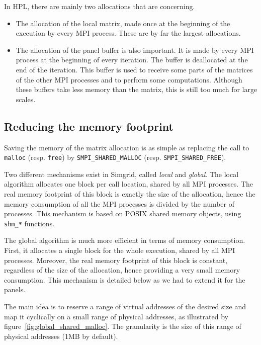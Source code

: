 \documentclass[12pt, a4paper]{memoir}
\begin{document}
In HPL, there are mainly two allocations that are concerning.
\begin{itemize}
\item The allocation of the local matrix, made once at the beginning of the execution by every MPI process. These are by
far the largest allocations.
\item The allocation of the panel buffer is also important. It is made by every MPI process at the beginning of every
iteration. The buffer is deallocated at the end of the iteration. This buffer is used to receive some parts of the
matrices of the other MPI processes and to perform some computations. Although these buffers take less memory than
the matrix, this is still too much for large scales.
\end{itemize}
\subsection{Reducing the memory footprint}
\label{sec:org7de7ffe}
Saving the memory of the matrix allocation is as simple as replacing the call to \texttt{malloc} (resp. \texttt{free}) by
\texttt{SMPI\_SHARED\_MALLOC} (resp. \texttt{SMPI\_SHARED\_FREE}).

Two different mechanisms exist in Simgrid, called \emph{local} and \emph{global}. The local algorithm allocates one block per call
location, shared by all MPI processes. The real memory footprint of this block is exactly the size of the allocation,
hence the memory consumption of all the MPI processes is divided by the number of processes. This mechanism is based
on POSIX shared memory objects, using \texttt{shm\_*} functions.

The global algorithm is much more efficient in terms of memory consumption. First, it allocates a single block for
the whole execution, shared by all MPI processes. Moreover, the real memory footprint of this block is constant,
regardless of the size of the allocation, hence providing a very small memory consumption. This mechanism is
detailed below as we had to extend it for the panels.

The main idea is to reserve a range of virtual addresses of the desired size and map it cyclically on a small range of
physical addresses, as illustrated by figure~\ref{fig:global_shared_malloc}. The granularity is the size of this
range of physical addresses (1MB by default).
\end{document}
